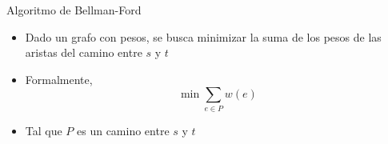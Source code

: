 \documentclass[]{beamer}
\begin{document}
\begin{frame}{Algoritmo de Bellman-Ford}
  \begin{itemize}
    \item Dado un grafo con pesos, se busca minimizar la suma de los pesos de las aristas del camino entre $s$ y $t$
      \pause
    \item Formalmente, $$ \min \sum_{e \in P} w(e)$$
      \pause
    \item Tal que $P$ es un camino entre $s$ y $t$
  \end{itemize}
\end{frame}
\end{document}
